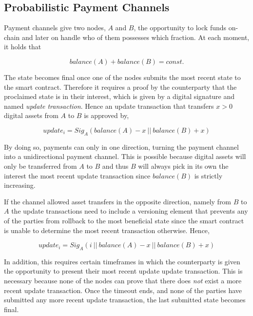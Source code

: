 \subsection{Probabilistic Payment Channels}
\label{sec:incentives:probabilistic}

Payment channels give two nodes, $A$ and $B$, the opportunity to lock funds on-chain and later on handle who of them possesses which fraction. At each moment, it holds that

$$ balance(A) + balance(B) = const. $$

The state becomes final once one of the nodes submits the most recent state to the smart contract. Therefore it requires a proof by the counterparty that the proclaimed state is in their interest, which is given by a digital signature and named \textit{update transaction}. Hence an update transaction that transfers $x > 0$ digital assets from $A$ to $B$ is approved by,

$$ update_i = Sig_A (balance(A) - x \ || \ balance(B) + x) $$

By doing so, payments can only in one direction, turning the payment channel into a unidirectional payment channel. This is possible because digital assets will only be transferred from $A$ to $B$ and thus $B$ will always pick in its own the interest the most recent update transaction since $balance(B)$ is strictly increasing.

If the channel allowed asset transfers in the opposite direction, namely from $B$ to $A$ the update transactions need to include a versioning element that prevents any of the parties from rollback to the most beneficial state since the smart contract is unable to determine the most recent transaction otherwise. Hence,

$$ update_i = Sig_A (i \ || \ balance(A) - x \ || \ balance(B) + x) $$

In addition, this requires certain timeframes in which the counterparty is given the opportunity to present their most recent update update transaction. This is necessary because none of the nodes can prove that there does \textit{not} exist a more recent update transaction. Once the timeout ends, and none of the parties have submitted any more recent update transaction, the last submitted state becomes final.

